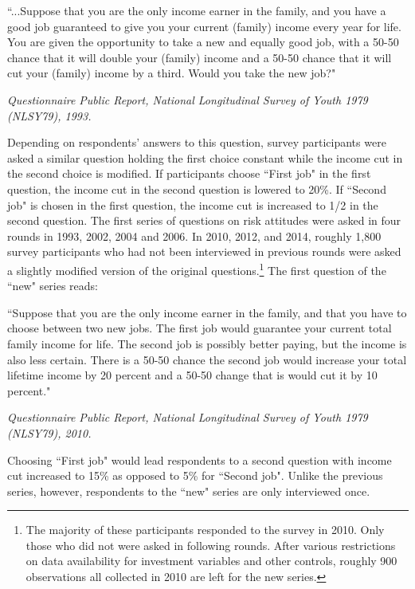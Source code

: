 \documentclass[]{article}
\begin{document}
\begin{center}
\begin{minipage}[!h]{.9\linewidth}\small
	``...Suppose that you are the only income earner in the family, and you have a good job guaranteed to give you your current (family) income every year for life. You are given the opportunity to take a new and equally good job, with a 50-50 chance that it will double your (family) income and a 50-50 chance that it will cut your (family) income by a third. Would you take the new job?"
\end{minipage}
\end{center}
\begin{flushright}
	\textit{Questionnaire Public Report, National Longitudinal Survey of Youth 1979 (NLSY79), 1993.}
\end{flushright}
Depending on respondents' answers to this question, survey participants were asked a similar question holding the first choice constant while the income cut in the second choice is modified. If participants choose ``First job" in the first question, the income cut in the second question is lowered to 20\%. If ``Second job" is chosen in the first question, the income cut is increased to 1/2 in the second question. The first series of questions on risk attitudes were asked in four rounds in 1993, 2002, 2004 and 2006. In 2010, 2012, and 2014, roughly 1,800 survey participants who had not been interviewed in previous rounds were asked a slightly modified version of the original questions.\footnote{The majority of these participants responded to the survey in 2010. Only those who did not were asked in following rounds. After various restrictions on data availability for investment variables and other controls, roughly 900 observations all collected in 2010 are left for the new series.} The first question of the ``new" series reads:

\begin{center}
\begin{minipage}{.9\linewidth}\small
	``Suppose that you are the only income earner in the family, and that you have to choose between two new jobs. The first job would guarantee your current total family income for life. The second job is possibly better paying, but the income is also less certain. There is a 50-50 chance the second job would increase your total lifetime income by 20 percent and a 50-50 change that is would cut it by 10 percent."
\end{minipage}
\end{center} 
\begin{flushright}
	\textit{Questionnaire Public Report, National Longitudinal Survey of Youth 1979 (NLSY79), 2010.}
\end{flushright}
Choosing ``First job" would lead respondents to a second question with income cut increased to 15\% as opposed to 5\% for ``Second job". Unlike the previous series, however, respondents to the ``new" series are only interviewed once. 
\end{document}
